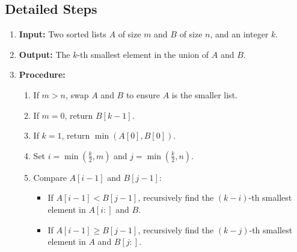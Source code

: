 \documentclass{article}
\begin{document}
\begin{itemize}
\section*{Detailed Steps}
\begin{enumerate}
    \item \textbf{Input:} Two sorted lists $A$ of size $m$ and $B$ of size $n$, and an integer $k$.
    \item \textbf{Output:} The $k$-th smallest element in the union of $A$ and $B$.
    \item \textbf{Procedure:}
    \begin{enumerate}
        \item If $m > n$, swap $A$ and $B$ to ensure $A$ is the smaller list.
        \item If $m = 0$, return $B[k-1]$.
        \item If $k = 1$, return $\min(A[0], B[0])$.
        \item Set $i = \min(\frac{k}{2}, m)$ and $j = \min(\frac{k}{2}, n)$.
        \item Compare $A[i-1]$ and $B[j-1]$:
        \begin{itemize}
            \item If $A[i-1] < B[j-1]$, recursively find the $(k - i)$-th smallest element in $A[i:]$ and $B$.
            \item If $A[i-1] \geq B[j-1]$, recursively find the $(k - j)$-th smallest element in $A$ and $B[j:]$.
        \end{itemize}
    \end{enumerate}
\end{enumerate}

\end{itemize}
\end{document}
